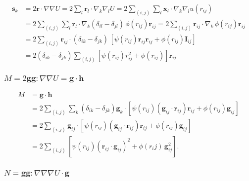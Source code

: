 \documentclass{article}
\begin{document}
\begin{align*}
\mathbf s_k &= 2 \mathbf r \cdot \nabla \nabla U
  = 2 \sum_l \mathbf r_l \cdot \nabla_k \nabla_l U
  = 2 \sum_{(i, j)} \sum_l \mathbf x_l \cdot \nabla_k \nabla_l u(r_{ij})
\\
  &= 2 \sum_{(i, j)} \sum_l \mathbf r_l \cdot \nabla_k 
    (\delta_{il} - \delta_{jl}) \, \phi(r_{ij}) \mathbf r_{ij} 
  = 2 \sum_{(i, j)} \mathbf r_{ij} \cdot \nabla_k 
    \, \phi(r_{ij}) \mathbf r_{ij}
\\
  &= 2 \sum_{(i, j)} \mathbf r_{ij} \cdot 
    (\delta_{ik} - \delta_{jk}) \, 
    [\psi(r_{ij}) \mathbf r_{ij} \mathbf r_{ij}
    + \phi(r_{ij}) \mathbf I_{ij}]
\\
  &= 2 (\delta_{ik} - \delta_{jk}) 
      \sum_{(i, j)} [\psi(r_{ij}) r_{ij}^2 + \phi(r_{ij}) ] \mathbf r_{ij}
\end{align*}



\subsubsection{$M = 2 \mathbf g \mathbf g : \nabla \nabla U = \mathbf g \cdot \mathbf h$}

\begin{align*}
M &= \mathbf g \cdot \mathbf h
\\
  &= 2 \sum_{(i, j)} \sum_k (\delta_{ik} - \delta_{jk}) 
    \mathbf g_k \cdot [\psi(r_{ij}) (\mathbf g_{ij} \cdot \mathbf r_{ij}) \mathbf r_{ij}
    + \phi(r_{ij}) \mathbf g_{ij}]
\\
  &= 2 \sum_{(i, j)} 
    \mathbf g_{ij} \cdot [\psi(r_{ij}) (\mathbf g_{ij} \cdot \mathbf r_{ij}) \mathbf r_{ij}
    + \phi(r_{ij}) \mathbf g_{ij}]
\\
  &= 2 \sum_{(i, j)} 
    [\psi(r_{ij}) (\mathbf r_{ij} \cdot \mathbf g_{ij})^2 + \phi(r_ij)\, \mathbf g_{ij}^2].
\end{align*}



\subsubsection{$N = \mathbf g \mathbf g : \nabla \nabla \nabla U \cdot \mathbf g$}
\end{document}
